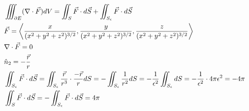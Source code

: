 \documentclass[11pt, fleqn]{article}
\begin{document}
\begin{align*}
    &\iiint_{\partial E}(\nabla\cdot \vec{F})dV=\iint_S\vec{F}\cdot d\vec{S}+\iint_{S_{\epsilon}}\vec{F}\cdot d\vec{S}\\
    &\vec{F}=\left\langle \frac{x}{(x^2+y^2+z^2)^{3/2}},\frac{y}{(x^2+y^2+z^2)^{3/2}},\frac{z}{(x^2+y^2+z^2)^{3/2}} \right\rangle\\
    &\nabla\cdot\vec{F}=0\\
    &\hat{n}_2=-\frac{\vec{r}}{r}\\
    &\iint_{S_{\epsilon}}\vec{F}\cdot d\vec{S}=\iint_{S_{\epsilon}}\frac{\vec{r}}{r^3}\cdot\frac{-\vec{r}}{r}dS=-\iint_{S_{\epsilon}}\frac{1}{r^2}dS=-\frac{1}{\epsilon^2}\iint_{S_{\epsilon}}dS=-\frac{1}{\epsilon^2}\cdot 4\pi\epsilon^2=-4\pi\\
    &\iint_S\vec{F}\cdot d\vec{S}=-\iint_{S_{\epsilon}}\vec{F}\cdot d\vec{S}=4\pi
\end{align*}
\end{document}
